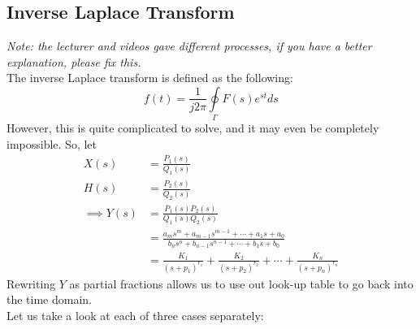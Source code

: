 \documentclass[nobib]{tufte-handout}
\begin{document}
\subsection{Inverse Laplace Transform}
\textit{Note: the lecturer and videos gave different processes, if you have a better explanation, please fix this.}\\
The inverse Laplace transform is defined as the following:
\begin{equation*}
    f(t)=\frac{1}{j2\pi}\oint\limits_{\Gamma}F(s)e^{st}ds
\end{equation*}
However, this is quite complicated to solve, and it may even be completely impossible. So, let
\begin{align*}
    X(s)          & = \frac{P_1(s)}{Q_1(s)}                                                                 \\
    H(s)          & = \frac{P_2(s)}{Q_2(s)}                                                                 \\
    \implies Y(s) & = \frac{P_1(s)P_2(s)}{Q_1(s)Q_2(s)}                                                     \\
                  & = \frac{a_m s^m+a_{m-1}s^{m-1}+\cdots+a_1s+a_0}{b_n s^n+b_{n-1}s^{n-1}+\cdots+b_1s+b_0} \\
                  & = \frac{K_1}{(s+p_1)^{r_1}}+\frac{K_2}{(s+p_2)^{r_2}}+\cdots+\frac{K_n}{(s+p_n)^{r_n}}
\end{align*}
Rewriting $Y$ as partial fractions allows us to use out look-up table to go back into the time domain.\\
Let us take a look at each of three cases separately:
\end{document}
